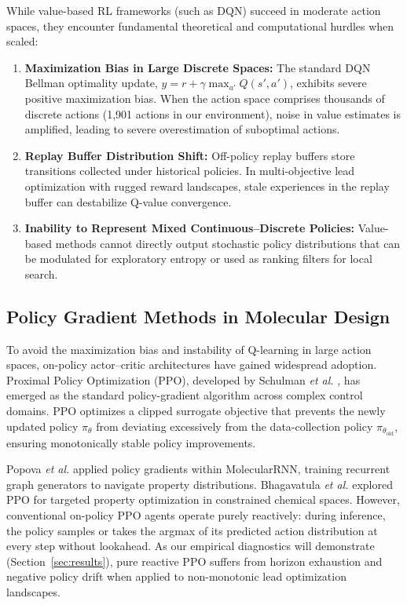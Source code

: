 \documentclass{ieeeaccess}
\begin{document}
While value-based RL frameworks (such as DQN) succeed in moderate action spaces, they encounter fundamental theoretical and computational hurdles when scaled:
\begin{enumerate}
    \item \textbf{Maximization Bias in Large Discrete Spaces:} The standard DQN Bellman optimality update, $y = r + \gamma \max_{a'} Q(s', a')$, exhibits severe positive maximization bias. When the action space comprises thousands of discrete actions (1,901 actions in our environment), noise in value estimates is amplified, leading to severe overestimation of suboptimal actions.
    \item \textbf{Replay Buffer Distribution Shift:} Off-policy replay buffers store transitions collected under historical policies. In multi-objective lead optimization with rugged reward landscapes, stale experiences in the replay buffer can destabilize Q-value convergence.
    \item \textbf{Inability to Represent Mixed Continuous--Discrete Policies:} Value-based methods cannot directly output stochastic policy distributions that can be modulated for exploratory entropy or used as ranking filters for local search.
\end{enumerate}

\subsection{Policy Gradient Methods in Molecular Design}
To avoid the maximization bias and instability of Q-learning in large action spaces, on-policy actor--critic architectures have gained widespread adoption. Proximal Policy Optimization (PPO), developed by Schulman \emph{et al.} \cite{schulman2017}, has emerged as the standard policy-gradient algorithm across complex control domains. PPO optimizes a clipped surrogate objective that prevents the newly updated policy $\pi_\theta$ from deviating excessively from the data-collection policy $\pi_{\theta_{\text{old}}}$, ensuring monotonically stable policy improvements.

Popova \emph{et al.} \cite{popova2019} applied policy gradients within MolecularRNN, training recurrent graph generators to navigate property distributions. Bhagavatula \emph{et al.} \cite{bhagavatula2021} explored PPO for targeted property optimization in constrained chemical spaces. However, conventional on-policy PPO agents operate purely reactively: during inference, the policy samples or takes the argmax of its predicted action distribution at every step without lookahead. As our empirical diagnostics will demonstrate (Section~\ref{sec:results}), pure reactive PPO suffers from horizon exhaustion and negative policy drift when applied to non-monotonic lead optimization landscapes.
\end{document}
